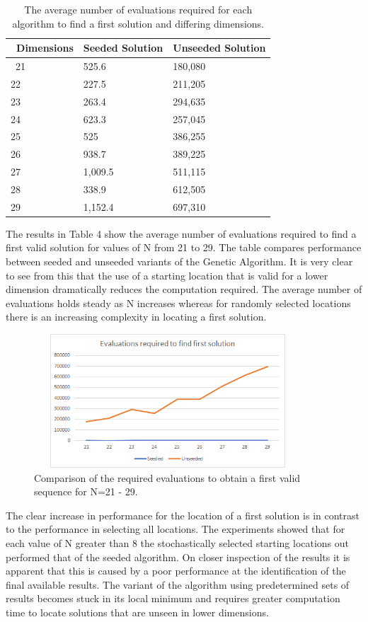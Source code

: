 \documentclass[a4paper,onecolumn,11pt]{article}
\begin{document}
\begin{table}[ht]
	\begin{tabular}{|p{2cm}|p{6cm}|p{6cm}|} 
		\hline\
		Dimensions & Seeded Solution & Unseeded Solution \\
		\hline\
		21 & 525.6 & 180,080 \\
		22 & 227.5 & 211,205 \\
		23 & 263.4 & 294,635 \\
		24 & 623.3 & 257,045 \\
		25 & 525 & 386,255 \\
		26 & 938.7 & 389,225 \\
		27 & 1,009.5 & 511,115 \\
		28 & 338.9 & 612,505 \\
		29 & 1,152.4 & 697,310 \\		
		\hline
	\end{tabular}
	\caption{The average number of evaluations required for each algorithm to find a first solution and differing dimensions.}
\end{table}

The results in Table 4 show the average number of evaluations required to find a first valid solution for values of N from 21 to 29. The table compares performance between seeded and unseeded variants of the Genetic Algorithm. It is very clear to see from this that the use of a starting location that is valid for a lower dimension dramatically reduces the computation required. The average number of evaluations holds steady as N increases whereas for randomly selected locations there is an increasing complexity in locating a first solution.

\begin{figure}[!htbp]
	\centering	
	\includegraphics[width=10cm, height=5cm]{EvaluationsFirstSolution}
	\caption{Comparison of the required evaluations to obtain a first valid sequence for N=21 - 29.}
\end{figure}

The clear increase in performance for the location of a first solution is in contrast to the performance in selecting all locations. The experiments showed that for each value of N greater than 8 the stochastically selected starting locations out performed that of the seeded algorithm. On closer inspection of the results it is apparent that this is caused by a poor performance at the identification of the final available results. The variant of the algorithm using predetermined sets of results becomes stuck in its local minimum and requires greater computation time to locate solutions that are unseen in lower dimensions.
\end{document}
